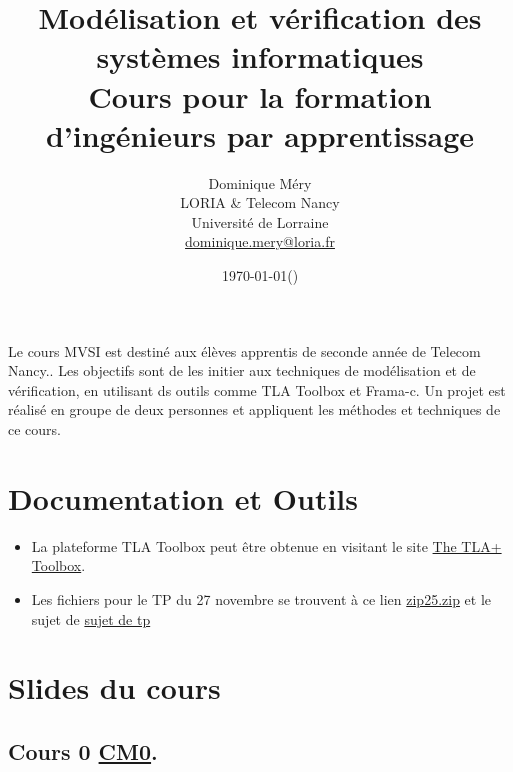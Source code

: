 \documentclass[ 12pt]{article}
\title{Modélisation et vérification des systèmes informatiques\\
Cours  pour la formation d'ingénieurs par apprentissage}
\author{Dominique M\'ery\\
LORIA \& Telecom Nancy\\ Universit\'e de Lorraine\\ \url{dominique.mery@loria.fr}}
\date{\today (\now)}
\begin{document}



  \setcounter{ex}{1}
\maketitle

Le cours MVSI  est destiné aux élèves apprentis de seconde année  de
Telecom Nancy..
Les objectifs sont de les initier aux techniques de modélisation et
de vérification, en utilisant ds outils comme TLA Toolbox et Frama-c.
Un projet est réalisé  en groupe de deux personnes et appliquent  les
méthodes  et techniques de ce cours. 


  \tableofcontents 

\section{Documentation et Outils}




\begin{itemize}

  
\item La plateforme TLA Toolbox peut être  obtenue en visitant le site
  \href{https://lamport.azurewebsites.net/tla/toolbox.html}{The TLA+
    Toolbox}.

\item Les fichiers pour le TP du 27 novembre se trouvent à ce lien
  \href{http://mery54.github.io/teaching/mvsi/lecturesnotes/zip25.zip}{zip25.zip}
  et le sujet de
  \href{http://mery54.github.io/teaching/mvsi/lecturesnotes/tp25.pdf}{sujet
    de tp}

  


  
\end{itemize}


\section{Slides du cours}
\label{sec:course-mcfsi-at}




\subsection{Cours 0
  \href{http://mery54.github.io/teaching/mvsi/lecturesnotes/mvsilecture0.pdf}{CM0}. }
\end{document}
